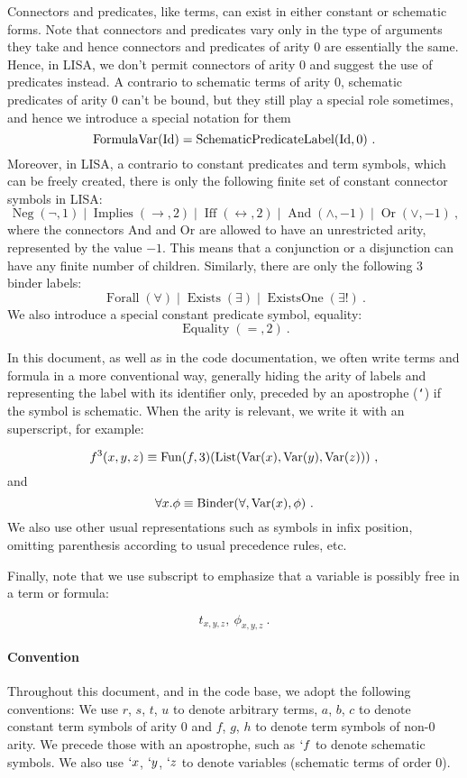 \begin{defin}[Formulas]
  Connectors and predicates, like terms, can exist in either constant or schematic forms. Note that connectors and predicates vary only in the type of arguments they take and hence connectors and predicates of arity 0 are essentially the same. Hence, in LISA, we don't permit connectors of arity 0 and suggest the use of predicates instead.
  A contrario to schematic terms of arity 0, schematic predicates of arity 0 can't be bound, but they still play a special role sometimes, and hence we introduce a special notation for them
  $$
    \operatorname{FormulaVar}(\textnormal{Id}) = \operatorname{SchematicPredicateLabel}(\textnormal{Id}, 0)~.
  $$
  Moreover, in LISA, a contrario to constant predicates and term symbols, which can be freely created, there is only the following finite set of constant connector symbols in LISA:
  $$
    \operatorname{Neg}(\neg, 1)\mid \operatorname{Implies}(\rightarrow, 2)\mid \operatorname{Iff}(\leftrightarrow, 2)\mid \operatorname{And}(\land, -1)\mid \operatorname{Or}(\lor, -1)~,
  $$
  where the connectors And and Or are allowed to have an unrestricted arity, represented by the value $-1$. This means that a conjunction or a disjunction can have any finite number of children.
  Similarly, there are only the following 3 binder labels:
  $$
    \operatorname{Forall}(\forall)\mid \operatorname{Exists}(\exists)\mid \operatorname{ExistsOne}(\exists !)~.
  $$
  We also introduce a special constant predicate symbol, equality:
  $$
    \operatorname{Equality}(=, 2)~.
  $$
\end{defin}


In this document, as well as in the code documentation, we often write terms and formula in a more conventional way, generally hiding the arity of labels and representing the label with its identifier only, preceded by an apostrophe (\texttt{`}) if the symbol is schematic. When the arity is relevant, we write it with an superscript, for example:

$$
  f^3(x,y,z) \equiv \operatorname{Fun}(f, 3)(\operatorname{List}(\operatorname{Var}(x), \operatorname{Var}(y), \operatorname{Var}(z)))~,
$$
and
$$
  \forall x. \phi \equiv \operatorname{Binder}(\forall, \operatorname{Var}(x), \phi)~.
$$
We also use other usual representations such as symbols in infix position, omitting parenthesis according to usual precedence rules, etc.

Finally, note that we use subscript to emphasize that a variable is possibly free in a term or formula:

$$
  t_{x,y,z}, ~\phi_{x,y,z}~.
$$

\paragraph{Convention} Throughout this document, and in the code base, we adopt the following conventions: We use $r$, $s$, $t$, $u$ to denote arbitrary terms, $a$, $b$, $c$ to denote constant term symbols of arity $0$ and $f$, $g$, $h$ to denote term symbols of non-0 arity. We precede those with an apostrophe, such as $`f$ to denote schematic symbols. We also use $`x$, $`y$, $`z$ to denote variables (schematic terms of order $0$).

